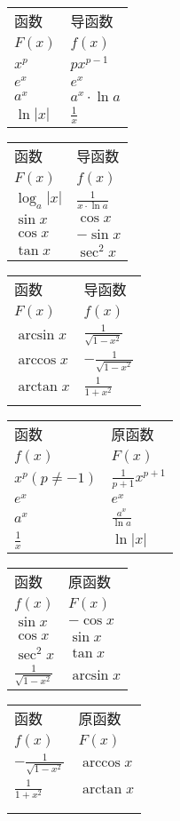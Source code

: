 \documentclass[a4paper,punct=CCT]{ctexbook}
\theoremstyle{definition}
\theoremstyle{remark}
\begin{document}
\begin{table*}[h]
  \caption*{导数表}
  \centering
  \begin{tabular}{ l l }
    函数		&	导函数 \\
    $F(x)$		&	$f(x)$ \\
    $x^p$		&	$px^{p-1}$ \\
    $e^x$		&	$e^x$ \\
    $a^x$		&	$a^x \cdot \ln a$ \\
    $\ln |x|$	&	$\frac{1}{x}$
  \end{tabular}
  \begin{tabular}{ l l }
    函数			&	导函数 \\
    $F(x)$			&	$f(x)$ \\
    $\log_a |x|$	&	$\frac{1}{x \cdot \ln a}$ \\
    $\sin x$		&	$\cos x$ \\
    $\cos x$		&	$-\sin x$ \\
    $\tan x$		&	$\sec^2 x$
  \end{tabular}
  \begin{tabular}{ l l }
    函数		&	导函数 \\
    $F(x)$		&	$f(x)$ \\
    $\arcsin x$	&	$\frac{1}{\sqrt{1-x^2}}$ \\
    $\arccos x$&	$-\frac{1}{\sqrt{1-x^2}}$ \\
    $\arctan x$&	$\frac{1}{1+x^2}$ \\ {}
  \end{tabular}
\end{table*}

\begin{table*}[h]
  \caption*{原函数表}
  \centering
  \begin{tabular}{ l l }
    函数			&	原函数 \\
    $f(x)$			&	$F(x)$ \\
    $x^p(p\ne-1)$	&	$\frac{1}{p+1} x^{p+1}$ \\
    $e^x$			&	$e^x$ \\
    $a^x$			&	$\frac{a^x}{\ln a}$ \\
    $\frac{1}{x}$	&	$\ln |x|$
  \end{tabular}
  \begin{tabular}{ l l }
    函数						&	原函数 \\
    $f(x)$						&	$F(x)$ \\
    $\sin x$					&	$-\cos x$ \\
    $\cos x$					&	$\sin x$ \\
    $\sec^2 x$					&	$\tan x$ \\
    $\frac{1}{\sqrt{1-x^2}}$	&	$\arcsin x$
  \end{tabular}
  \begin{tabular}{ l l }
    函数						&	原函数 \\
    $f(x)$						&	$F(x)$ \\
    $-\frac{1}{\sqrt{1-x^2}}$	&	$\arccos x$ \\
    $\frac{1}{1+x^2}$			&	$\arctan x$ \\ \\ {}
  \end{tabular}
\end{table*}
\end{document}
